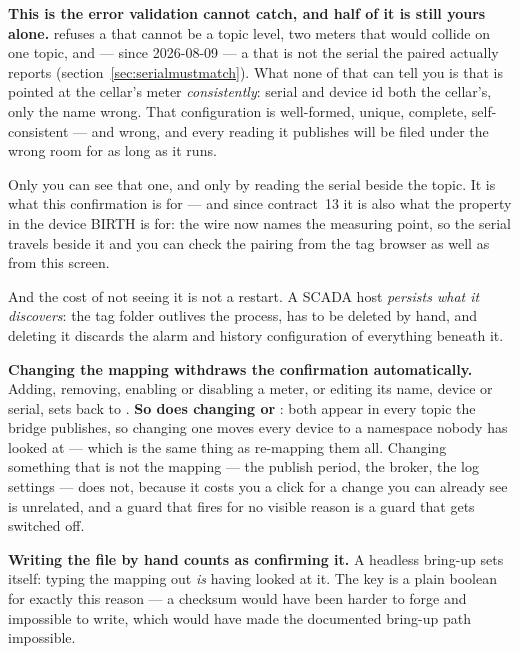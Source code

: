 \begin{warning}
\textbf{This is the error validation cannot catch, and half of it is still yours alone.} \prog
refuses a  that cannot be a topic level, two meters that would collide on one topic, and
--- since 2026-08-09 --- a  that is not the serial the paired 
actually reports (section~\ref{sec:serialmustmatch}). What none of that can tell you is that
 is pointed at the cellar's meter \emph{consistently}: serial and device id both
the cellar's, only the name wrong. That configuration is well-formed, unique, complete,
self-consistent --- and wrong, and every reading it publishes will be filed under the wrong
room for as long as it runs.

Only you can see that one, and only by reading the serial beside the topic. It is what this
confirmation is for --- and since contract~13 it is also what the  property in the
device BIRTH is for: the wire now names the measuring point, so the serial travels beside it and
you can check the pairing from the tag browser as well as from this screen.

And the cost of not seeing it is not a restart. A SCADA host \emph{persists what it discovers}: the
tag folder outlives the process, has to be deleted by hand, and deleting it discards the alarm and
history configuration of everything beneath it.
\end{warning}

\textbf{Changing the mapping withdraws the confirmation automatically.} Adding, removing, enabling
or disabling a meter, or editing its name, device or serial, sets  back to
. \textbf{So does changing  or }: both appear in every
topic the bridge publishes, so changing one moves every device to a namespace nobody has looked
at --- which is the same thing as re-mapping them all. Changing something that is not the mapping
--- the publish period, the broker, the log settings --- does not, because it costs you a click
for a change you can already see is unrelated, and a guard that fires for no visible reason is a
guard that gets switched off.

\begin{note}
\textbf{Writing the file by hand counts as confirming it.} A headless bring-up sets
 itself: typing the mapping out \emph{is} having looked at it. The
key is a plain boolean for exactly this reason --- a checksum would have been harder to forge and
impossible to write, which would have made the documented bring-up path impossible.
\end{note}

